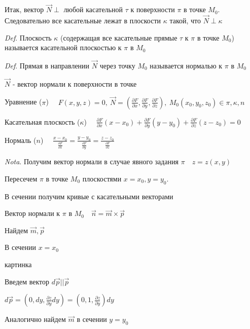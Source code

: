 \documentclass[12pt]{article}
\begin{document}
    Итак, вектор $\overrightarrow{N} \perp$ любой касательной $\tau$ к поверхности $\pi$ в точке $M_0$.
    Следовательно все касательные лежат в плоскости $\kappa$ такой, что $\overrightarrow{N} \perp \kappa$

    \vspace{3mm}
\textit{Def}. Плоскость $\kappa$ (содержащая все касательные прямые $\tau$ к $\pi$ в точке $M_0$) называется касательной плоскостью к $\pi$ в $M_0$

    \vspace{3mm}
\textit{Def}. Прямая в направлении $\overrightarrow{N}$ через точку $M_0$ называется нормалью к $\pi$ в $M_0$

    $\overrightarrow{N}$ - вектор нормали к поверхности в точке

    Уравнение ($\pi$) $\displaystyle \quad F(x, y, z) = 0, \ \overrightarrow{N} = (\frac{\partial F}{\partial x}, \frac{\partial F}{\partial y}, \frac{\partial F}{\partial z}), \ M_0(x_0, y_0, z_0) \in \pi, \kappa, n$

    Касательная плоскость ($\kappa$) $\displaystyle \quad \frac{\partial F}{\partial x} (x - x_0) + \frac{\partial F}{\partial y} (y - y_0) + \frac{\partial F}{\partial z} (z - z_0) = 0$

    Нормаль ($n$) $\displaystyle \quad \frac{x - x_0}{\frac{\partial F}{\partial x}} = \frac{y - y_0}{\frac{\partial F}{\partial y}} = \frac{z - z_0}{\frac{\partial F}{\partial z}}$

    \vspace{3mm}
\textit{Nota}. Получим вектор нормали в случае явного задания $\pi \quad z = z(x, y)$

    Пересечем $\pi$ в точке $M_0$ плоскостями $x = x_0, y = y_0$.

    В сечении получим кривые с касательными векторами

    Вектор нормали к $\pi$ в $M_0 \quad \overrightarrow{n} = \overrightarrow{m} \times \overrightarrow{p}$

    Найдем $\overrightarrow{m}, \overrightarrow{p}$

    В сечении $x = x_0$

    картинка

    Введем вектор $d\overrightarrow{p} || \overrightarrow{p}$

    $\displaystyle d\overrightarrow{p} = (0, dy, \frac{\partial z}{\partial y}dy) = (0, 1, \frac{\partial z}{\partial y}) dy$

    Аналогично найдем $\overrightarrow{m}$ в сечении $y = y_0$
\end{document}
